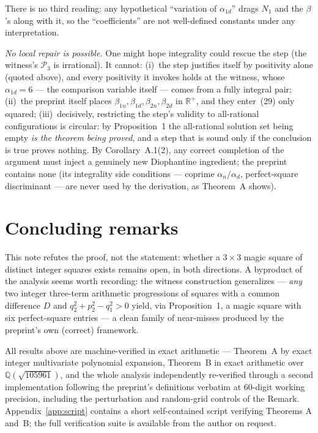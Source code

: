 \documentclass[11pt]{amsart}
\theoremstyle{remark}
\newcommand{\Q}{\mathbb{Q}}
\newcommand{\R}{\mathbb{R}}
\newcommand{\cP}{\mathcal{P}}
\begin{document}
There is no third reading: any hypothetical ``variation of
$\alpha_{1d}$'' drags $N_1$ and the $\beta$'s along with it, so the
``coefficients'' are not well-defined constants under any
interpretation.

\emph{No local repair is possible.} One might hope integrality could
rescue the step (the witness's $\cP_3$ is irrational). It cannot:
(i)~the step justifies itself by positivity alone (quoted above), and
every positivity it invokes holds at the witness, whose $\alpha_{1d} =
6$ --- the comparison variable itself --- comes from a fully integral
pair; (ii)~the preprint itself places $\beta_{1n}, \beta_{1d},
\beta_{2n}, \beta_{2d}$ in $\R^+$, and they enter~(29) only squared;
(iii)~decisively, restricting the step's validity to all-rational
configurations is circular: by Proposition~1 the all-rational solution
set being empty \emph{is the theorem being proved}, and a step that is
sound only if the conclusion is true proves nothing. By
Corollary~A.1(2), any correct completion of the argument must inject a
genuinely new Diophantine ingredient; the preprint contains none (its
integrality side conditions --- coprime $\alpha_n/\alpha_d$,
perfect-square discriminant --- are never used by the derivation, as
Theorem~A shows).

\section{Concluding remarks}

This note refutes the proof, not the statement: whether a $3\times 3$
magic square of distinct integer squares exists remains open, in both
directions. A byproduct of the analysis seems worth recording: the
witness construction generalizes --- \emph{any} two integer three-term
arithmetic progressions of squares with a common difference $D$ and
$q_2^2 + p_2^2 - q_1^2 > 0$ yield, via Proposition~1, a magic square
with six perfect-square entries --- a clean family of near-misses
produced by the preprint's own (correct) framework.

All results above are machine-verified in exact arithmetic ---
Theorem~A by exact integer multivariate polynomial expansion,
Theorem~B in exact arithmetic over $\Q(\sqrt{105961})$, and the whole
analysis independently re-verified through a second implementation
following the preprint's definitions verbatim at 60-digit working
precision, including the perturbation and random-grid controls of the
Remark. Appendix~\ref{app:script} contains a short self-contained
script verifying Theorems A and~B; the full verification suite is
available from the author on request.
\end{document}
